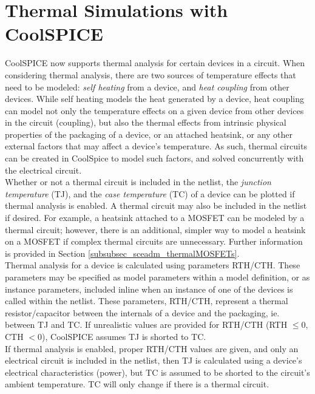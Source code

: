 \chapter{Thermal Simulations with CoolSPICE}
\label{chap_thermalsimulations_tas}

CoolSPICE now supports thermal analysis for certain devices in a circuit. When considering thermal analysis, there are two sources of temperature effects that need to be modeled: \textit{self heating} from a device, and \textit{heat coupling} from other devices. While self heating models the heat generated by a device, heat coupling can model not only the temperature effects on a given device from other devices in the circuit (coupling), but also the thermal effects from intrinsic physical properties of the packaging of a device, or an attached heatsink, or any other external factors that may affect a device's temperature. As such, thermal circuits can be created in CoolSpice to model such factors, and solved concurrently with the electrical circuit. \\

Whether or not a thermal circuit is included in the netlist, the \textit{junction temperature} (TJ), and the \textit{case temperature} (TC) of a device can be plotted if thermal analysis is enabled. A thermal circuit may also be included in the netlist if desired. For example, a heatsink attached to a MOSFET can be modeled by a thermal circuit; however, there is an additional, simpler way to model a heatsink on a MOSFET if complex thermal circuits are unnecessary. Further information is provided in Section \ref{subsubsec_sceadm_thermalMOSFETs}. \\

Thermal analysis for a device is calculated using parameters RTH/CTH. These parameters may be specified as model parameters within a model definition, or as instance parameters, included inline when an instance of one of the devices is called within the netlist. These parameters, RTH/CTH, represent a thermal resistor/capacitor between the internals of a device and the packaging, ie. between TJ and TC. If unrealistic values are provided for RTH/CTH (RTH $\leq 0$, CTH $< 0$), CoolSPICE assumes TJ is shorted to TC. \\

If thermal analysis is enabled, proper RTH/CTH values are given, and only an electrical circuit is included in the netlist, then TJ is calculated using a device's electrical characteristics (power), but TC is assumed to be shorted to the circuit's ambient temperature. TC will only change if there is a thermal circuit.

